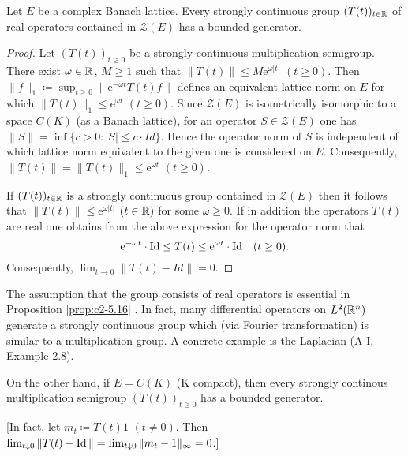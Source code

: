 \begin{proposition}\label{prop:c2-5.16}
Let $E$ be a complex Banach lattice.
Every strongly continuous group $(T(t))_{t \in \mathbb{R}}$ of real operators contained in $\mathcal{Z}(E)$ has a bounded generator.
\end{proposition}
\begin{proof}
Let $(T(t))_{t \geq 0}$ be a strongly continuous multiplication semigroup.
There exist $\omega \in \mathbb{R}$, $M \geq 1$ such that $\|T(t)\| \leq M\mathrm{e}^{\omega|t|}$ $(t \geq 0)$.
Then 
$\|f\|_1 \coloneqq \sup_{t \geq 0}\|\mathrm{e}^{-\omega t}T(t)f\|$ 
defines an equivalent lattice norm on $E$ for which 
$\|T(t)\|_1 \leq \mathrm{e}^{\omega t}$ $(t \geq 0)$.
Since $\mathcal{Z}(E)$ is isometrically isomorphic to a space $C(K)$ (as a Banach lattice), for an operator $S \in \mathcal{Z}(E)$ one has $\|S\| = \inf\{c > 0 \colon |S| \leq c \cdot Id\}$.
Hence the operator norm of $S$ is independent of which lattice norm equivalent to the given one is considered on $E$.
Consequently, $\|T(t)\| = \|T(t)\|_1 \leq \mathrm{e}^{\omega t}$ $(t \geq 0)$.

If $(T(t))_{t \in \mathbb{R}}$ is a strongly continuous group contained in $\mathcal{Z}(E)$ then it follows that $\|T(t)\| \leq \mathrm{e}^{\omega|t|}$ $(t \in \mathbb{R})$ for some $\omega \geq 0$. 
If in addition the operators $T(t)$ are real one obtains from the above expression for the operator norm that 
\[
\mathrm{e}^{- \omega t} \cdot \operatorname{Id} \leq T(t) \leq \mathrm{e}^{\omega t} \cdot \operatorname{Id} \quad (t \geq 0) .
\] 
Consequently, $\lim_{t \to 0}\|T(t) - Id\| = 0$.
\end{proof}

The assumption that the group consists of real operators is essential in Proposition \ref{prop:c2-5.16}  .
In fact, many differential operators on $L^{2}(\mathbb{R}^n)$ generate a strongly continuous group which (via Fourier transformation) is similar to a multiplication group.
A concrete example is the Laplacian (A-I, Example 2.8).

On the other hand, if $E = C(K)$ (K compact), then every strongly continous multiplication semigroup $(T(t))_{t \geq 0}$ has a bounded generator.

[In fact, let $m_t \coloneqq T(t)1$ $(t \neq 0)$.
Then $\lim_{t \downarrow 0}\|T(t) - \operatorname{Id}\| =    \lim_{t \downarrow 0}\|m_t - 1\|_{\infty} = 0$.]

